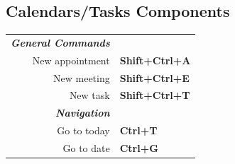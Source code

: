 \documentclass[12pt]{article}
\begin{document}
\begin{landscape}
\begin{center}
\begin{multicols}{2}
	\section*{Calendars/Tasks Components}
	\begin{tabular*}{4in}{rp{1.5in}}
		\textit{\textbf{General Commands}}	&					\\
		New appointment				& \textbf{Shift+Ctrl+A}			\\
		New meeting				& \textbf{Shift+Ctrl+E}			\\
		\vspace{1.5mm}
		New task				& \textbf{Shift+Ctrl+T}			\\
		\textit{\textbf{Navigation}}		&					\\
		Go to today				& \textbf{Ctrl+T}			\\
		Go to date				& \textbf{Ctrl+G}			\\
	\end{tabular*}
	\end{multicols}
	\end{center}
	\end{landscape}
 
\end{document}
